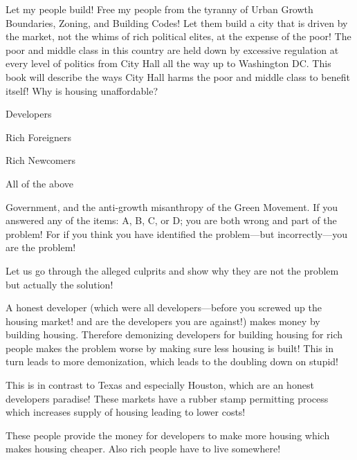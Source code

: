 \startchapter[title={Let My People Build!}]
\startsection[title={Let My People Build!}]
Let my people build!
Free my people from the tyranny of Urban Growth Boundaries, Zoning, and Building Codes!
Let them build a city that is driven by the market, not the whims of rich political elites, at the expense of the poor!
The poor and middle class in this country are held down by excessive regulation at every level of politics from  City Hall all the way up to Washington DC.
This book will describe the ways City Hall harms the poor and middle class to benefit itself!
\stopsection
\startsection[title={Why is housing unaffordable?}]
Why is housing unaffordable?
\startitemize[A]
\item Developers
\item Rich Foreigners
\item Rich Newcomers
\item All of the above
\item Government, and the anti-growth misanthropy of the Green Movement.
\stopitemize
If you answered any of the items: A, B, C, or D; you are both wrong and part of the problem!
For if you think you have identified the problem---but incorrectly---you are the problem!

Let us go through the alleged culprits and show why they are not the problem but actually the solution!

\startsection[title={Developers}]
A honest developer (which were all developers---before you screwed up the housing market! and are the developers you are against!) makes money by building housing.
Therefore demonizing developers for building housing for rich people makes the problem worse by making sure less housing is built! This in turn leads to more demonization, which leads to the doubling down on stupid!

This is in contrast to Texas and especially Houston, which are an honest developers paradise!
These markets have a rubber stamp permitting process which increases supply of housing leading to lower costs!
\stopsection

\startsection[title={Rich Foreigners and Newcomers}]
These people provide the money for developers to make more housing which makes housing cheaper.
Also rich people have to live somewhere!
\stopsection
\startsection[title={Filtering and Affordable Housing}]
\stopsection
\stopchapter
